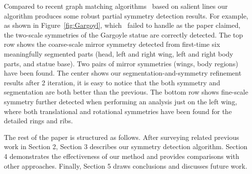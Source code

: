 Compared to recent graph matching algorithms~\cite{bokeloh2009,berner2011} based on salient lines our algorithm produces some robust partial symmetry detection results.
For example, as shown in Figure~\ref{fig:Gargoyl}, which~\cite{berner2011} failed to handle as the paper claimed, the two-scale symmetries of the Gargoyle statue are correctly detected.
The top row shows the coarse-scale mirror symmetry detected from first-time six meaningfully segmented parts (head, left and right wing, left and right body parts, and statue base).
Two pairs of mirror symmetries (wings, body regions) have been found.
The center shows our segmentation-and-symmetry refinement results after 2 iteration, it is easy to notice that the both symmetry and segmentation are both better than the previous.
The bottom row shows fine-scale symmetry further detected when performing an analysis just on the left wing, where both  translational and rotational symmetries have been found for the detailed rings and ribs.

The rest of the paper is structured as follows. After surveying related previous work in Section 2, Section 3 describes our symmetry detection algorithm.
Section 4 demonstrates the effectiveness of our method  and provides comparisons with other approaches. Finally, Section 5 draws conclusions and discusses future work. 